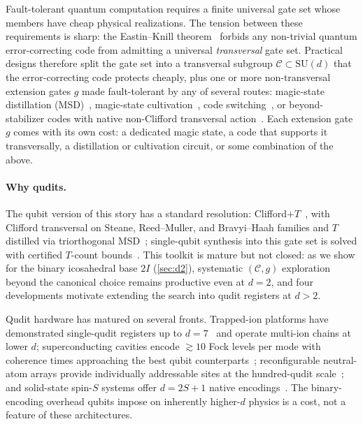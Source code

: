 \documentclass[twocolumn,superscriptaddress,showpacs,nofootinbib,notitlepage,preprintnumbers,secnumarabic,amssymb, nobibnotes, aps, prd]{revtex4-2}
\begin{document}
Fault-tolerant quantum computation requires a finite universal gate set whose members have cheap physical realizations. The tension between these requirements is sharp: the Eastin--Knill theorem~\cite{EastinKnill:2009} forbids any non-trivial quantum error-correcting code from admitting a universal \emph{transversal} gate set. Practical designs therefore split the gate set into a transversal subgroup $\mathcal{C}\subset\mathrm{SU}(d)$ that the error-correcting code protects cheaply, plus one or more non-transversal extension gates $g$ made fault-tolerant by any of several routes: magic-state distillation (MSD)~\cite{Bravyi:2004isx,Bravyi:2012czv}, magic-state cultivation~\cite{Gidney:2024cultivation}, code switching~\cite{OuyangJingBrennen:2024}, or beyond-stabilizer codes with native non-Clifford transversal action~\cite{Kubischta:2I,DenysLeverrier:2023,DenysLeverrier:2024}. Each extension gate $g$ comes with its own cost: a dedicated magic state, a code that supports it transversally, a distillation or cultivation circuit, or some combination of the above.

\paragraph*{Why qudits.}
The qubit version of this story has a standard resolution: Clifford$+T$~\cite{Kitaev:1997wr,Bravyi:2004isx}, with Clifford transversal on Steane, Reed--Muller, and Bravyi--Haah families and $T$ distilled via triorthogonal MSD~\cite{Bravyi:2004isx,Bravyi:2012czv}; single-qubit synthesis into this gate set is solved with certified $T$-count bounds~\cite{Ross:2014kbr,Kliuchnikov:2012pla}. This toolkit is mature but not closed: as we show for the binary icosahedral base $2I$ (\cref{sec:d2}), systematic $(\mathcal{C},g)$ exploration beyond the canonical choice remains productive even at $d=2$, and four developments motivate extending the search into qudit registers at $d>2$.

Qudit hardware has matured on several fronts. Trapped-ion platforms have demonstrated single-qudit registers up to $d=7$~\cite{Ringbauer:2022qudit} and operate multi-ion chains at lower $d$; superconducting cavities encode $\gtrsim\!10$ Fock levels per mode with coherence times approaching the best qubit counterparts~\cite{Kim:2025multiqudit}; reconfigurable neutral-atom arrays provide individually addressable sites at the hundred-qudit scale~\cite{Pecorari:2025natom}; and solid-state spin-$S$ systems offer $d=2S+1$ native encodings~\cite{Wang:2020qudits,Kiktenko:2024colloquium}. The binary-encoding overhead qubits impose on inherently higher-$d$ physics is a cost, not a feature of these architectures.
\end{document}

